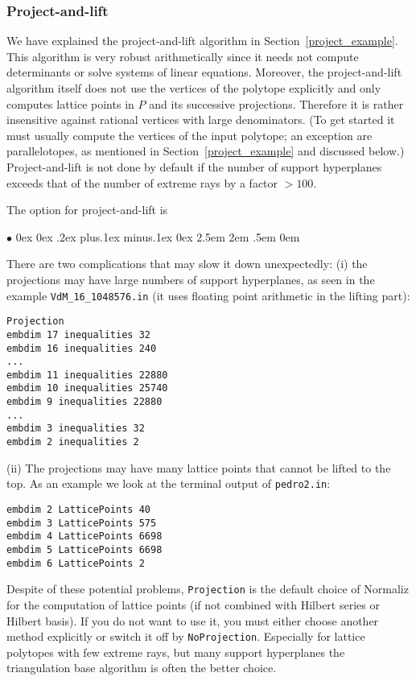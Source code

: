 \documentclass[12pt,a4paper]{scrartcl}
\newcommand{\stdli}{ \topsep0ex \partopsep0ex %
\parsep.2ex plus.1ex minus.1ex \itemsep0ex%
\leftmargin2.5em \labelwidth2em \labelsep.5em \rightmargin0em}%
\renewenvironment{itemize}{\begin{list}{{$\bullet$}}{\stdli}}{\end{list}}
\theoremstyle{definition}
\def\itemtt[#1]{\item[\textbf{\ttt{#1}}]}
\def\ttt{\texttt}
\begin{document}
\subsubsection{Project-and-lift}\label{project}

We have explained the project-and-lift algorithm in Section~\ref{project_example}.
This algorithm is very robust arithmetically since it needs not compute determinants or solve systems of linear equations. Moreover, the project-and-lift algorithm itself does not use the vertices of the polytope explicitly and only computes lattice points in $P$ and its successive projections. Therefore it is rather insensitive against rational vertices with large denominators. (To get started it must usually compute the vertices of the input polytope; an exception are parallelotopes, as mentioned in Section~\ref{project_example} and discussed below.) Project-and-lift is not done by default if the number of support hyperplanes exceeds that of the number of extreme rays by a factor $>100$.

The option for project-and-lift is
\begin{itemize}
	\itemtt [Projection, -j]
\end{itemize}

There are two complications that may slow it down unexpectedly: (i) the projections may have large numbers of support hyperplanes, as seen in the example \verb|VdM_16_1048576.in| (it uses floating point arithmetic in the lifting part):
\begin{Verbatim}
Projection
embdim 17 inequalities 32
embdim 16 inequalities 240
...
embdim 11 inequalities 22880
embdim 10 inequalities 25740
embdim 9 inequalities 22880
...
embdim 3 inequalities 32
embdim 2 inequalities 2
\end{Verbatim}

(ii) The projections may have many lattice points that cannot be lifted to the top. As an example we look at the terminal output of \verb|pedro2.in|:
\begin{Verbatim}
embdim 2 LatticePoints 40
embdim 3 LatticePoints 575
embdim 4 LatticePoints 6698
embdim 5 LatticePoints 6698
embdim 6 LatticePoints 2
\end{Verbatim}

Despite of these potential problems, \verb|Projection| is the default choice of Normaliz for the computation of lattice points (if not combined with Hilbert series or Hilbert basis). If you do not want to use it, you must either choose another method explicitly or switch it off by \verb|NoProjection|. Especially for lattice polytopes with few extreme rays, but many support hyperplanes the triangulation base algorithm is often the better choice.
\end{document}
